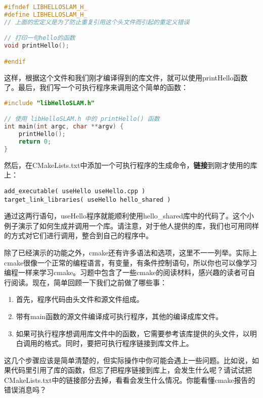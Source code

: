 \begin{lstlisting}[language=c++,caption=slambook2/ch2/libHelloSLAM.h]
#ifndef LIBHELLOSLAM_H_
#define LIBHELLOSLAM_H_
// 上面的宏定义是为了防止重复引用这个头文件而引起的重定义错误

// 打印一句hello的函数
void printHello();

#endif
\end{lstlisting}

这样，根据这个文件和我们刚才编译得到的库文件，就可以使用printHello函数了。最后，我们写一个可执行程序来调用这个简单的函数：

\begin{lstlisting}[language=c++,caption=slambook2/ch2/useHello.cpp]
#include "libHelloSLAM.h"

// 使用 libHelloSLAM.h 中的 printHello() 函数
int main(int argc, char **argv) {
	printHello();
	return 0;
}
\end{lstlisting}

然后，在CMakeLists.txt中添加一个可执行程序的生成命令，\textbf{链接}到刚才使用的库上：
\begin{lstlisting}[caption=slambook2/ch2/CMakeLists.txt]
add_executable( useHello useHello.cpp )
target_link_libraries( useHello hello_shared )
\end{lstlisting}

通过这两行语句，useHello程序就能顺利使用hello\_shared库中的代码了。这个小例子演示了如何生成并调用一个库。请注意，对于他人提供的库，我们也可用同样的方式对它们进行调用，整合到自己的程序中。

除了已经演示的功能之外，cmake还有许多语法和选项，这里不一一列举。实际上cmake很像一个正常的编程语言，有变量，有条件控制语句，所以你也可以像学习编程一样来学习cmake。习题中包含了一些cmake的阅读材料，感兴趣的读者可自行阅读。现在，简单回顾一下我们之前做了哪些事：

\begin{enumerate}
	\item 首先，程序代码由头文件和源文件组成。
	\item 带有main函数的源文件编译成可执行程序，其他的编译成库文件。
	\item 如果可执行程序想调用库文件中的函数，它需要参考该库提供的头文件，以明白调用的格式。同时，要把可执行程序链接到库文件上。
\end{enumerate}

这几个步骤应该是简单清楚的，但实际操作中你可能会遇上一些问题。比如说，如果代码里引用了库的函数，但忘了把程序链接到库上，会发生什么呢？请试试把CMakeLists.txt中的链接部分去掉，看看会发生什么情况。你能看懂cmake报告的错误消息吗？

